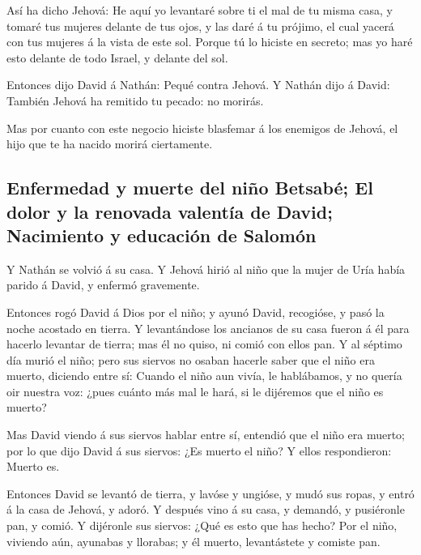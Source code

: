  Así ha dicho Jehová: He aquí yo levantaré sobre ti el
mal de tu misma casa, y tomaré tus mujeres delante de tus ojos, y las
daré á tu prójimo, el cual yacerá con tus mujeres á la vista de este
sol.  Porque tú lo hiciste en secreto; mas yo haré esto
delante de todo Israel, y delante del sol.

 Entonces dijo David á Nathán: Pequé contra Jehová. Y
Nathán dijo á David: También Jehová ha remitido tu pecado: no morirás.

 Mas por cuanto con este negocio hiciste blasfemar á los
enemigos de Jehová, el hijo que te ha nacido morirá ciertamente.

\hypertarget{enfermedad-y-muerte-del-niuxf1o-betsabuxe9-el-dolor-y-la-renovada-valentuxeda-de-david-nacimiento-y-educaciuxf3n-de-salomuxf3n}{%
\subsection{Enfermedad y muerte del niño Betsabé; El dolor y la renovada
valentía de David; Nacimiento y educación de
Salomón}\label{enfermedad-y-muerte-del-niuxf1o-betsabuxe9-el-dolor-y-la-renovada-valentuxeda-de-david-nacimiento-y-educaciuxf3n-de-salomuxf3n}}

 Y Nathán se volvió á su casa. Y Jehová hirió al niño que
la mujer de Uría había parido á David, y enfermó gravemente.

 Entonces rogó David á Dios por el niño; y ayunó David,
recogióse, y pasó la noche acostado en tierra.  Y
levantándose los ancianos de su casa fueron á él para hacerlo levantar
de tierra; mas él no quiso, ni comió con ellos pan.  Y al
séptimo día murió el niño; pero sus siervos no osaban hacerle saber que
el niño era muerto, diciendo entre sí: Cuando el niño aun vivía, le
hablábamos, y no quería oir nuestra voz: ¿pues cuánto más mal le hará,
si le dijéremos que el niño es muerto?

 Mas David viendo á sus siervos hablar entre sí, entendió
que el niño era muerto; por lo que dijo David á sus siervos: ¿Es muerto
el niño? Y ellos respondieron: Muerto es.

 Entonces David se levantó de tierra, y lavóse y ungióse,
y mudó sus ropas, y entró á la casa de Jehová, y adoró. Y después vino á
su casa, y demandó, y pusiéronle pan, y comió.  Y
dijéronle sus siervos: ¿Qué es esto que has hecho? Por el niño, viviendo
aún, ayunabas y llorabas; y él muerto, levantástete y comiste pan.

